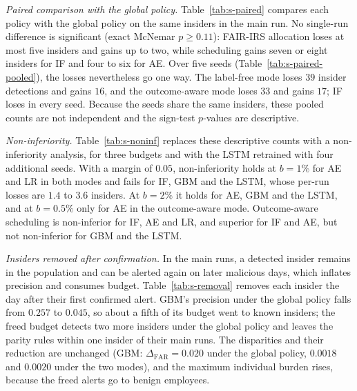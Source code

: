 \documentclass[10pt,onecolumn,letterpaper]{article}
\newcommand{\FAR}{\mathrm{FAR}}
\begin{document}
\emph{Paired comparison with the global policy.} Table~\ref{tab:s-paired} compares each policy with the global policy on the same insiders in the main run. No single-run difference is significant (exact McNemar $p\ge0.11$): FAIR-IRS allocation loses at most five insiders and gains up to two, while scheduling gains seven or eight insiders for IF and four to six for AE. Over five seeds (Table~\ref{tab:s-paired-pooled}), the losses nevertheless go one way. The label-free mode loses $39$ insider detections and gains $16$, and the outcome-aware mode loses $33$ and gains $17$; IF loses in every seed. Because the seeds share the same insiders, these pooled counts are not independent and the sign-test $p$-values are descriptive.

\emph{Non-inferiority.} Table~\ref{tab:s-noninf} replaces these descriptive counts with a non-inferiority analysis, for three budgets and with the LSTM retrained with four additional seeds. With a margin of $0.05$, non-inferiority holds at $b=1\%$ for AE and LR in both modes and fails for IF, GBM and the LSTM, whose per-run losses are $1.4$ to $3.6$ insiders. At $b=2\%$ it holds for AE, GBM and the LSTM, and at $b=0.5\%$ only for AE in the outcome-aware mode. Outcome-aware scheduling is non-inferior for IF, AE and LR, and superior for IF and AE, but not non-inferior for GBM and the LSTM.

\emph{Insiders removed after confirmation.} In the main runs, a detected insider remains in the population and can be alerted again on later malicious days, which inflates precision and consumes budget. Table~\ref{tab:s-removal} removes each insider the day after their first confirmed alert. GBM's precision under the global policy falls from $0.257$ to $0.045$, so about a fifth of its budget went to known insiders; the freed budget detects two more insiders under the global policy and leaves the parity rules within one insider of their main runs. The disparities and their reduction are unchanged (GBM: $\Delta_{\FAR}=0.020$ under the global policy, $0.0018$ and $0.0020$ under the two modes), and the maximum individual burden rises, because the freed alerts go to benign employees.
\end{document}
